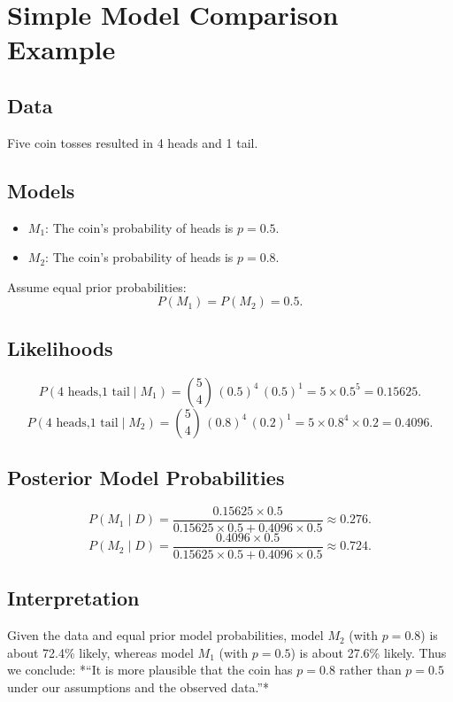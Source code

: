 \documentclass[10pt,a4paper]{article}
\begin{document}
	
	\section*{Simple Model Comparison Example}
	
	\subsection*{Data}
	Five coin tosses resulted in 4 heads and 1 tail.
	
	\subsection*{Models}
	\begin{itemize}
		\item \(M_1\): The coin’s probability of heads is \(p = 0.5\).
		\item \(M_2\): The coin’s probability of heads is \(p = 0.8\).
	\end{itemize}
	
	Assume equal prior probabilities:
	\[
	P(M_1) = P(M_2) = 0.5.
	\]
	
	\subsection*{Likelihoods}
	\[
	P(\text{4 heads,1 tail} \mid M_1)
	= \binom{5}{4}\,(0.5)^4\,(0.5)^1
	= 5 \times 0.5^5 = 0.15625.
	\]
	\[
	P(\text{4 heads,1 tail} \mid M_2)
	= \binom{5}{4}\,(0.8)^4\,(0.2)^1
	= 5 \times 0.8^4 \times 0.2 = 0.4096.
	\]
	
	\subsection*{Posterior Model Probabilities}
	\[
	P(M_1 \mid D)
	= \frac{0.15625 \times 0.5}
	{0.15625 \times 0.5 + 0.4096 \times 0.5}
	\approx 0.276.
	\]
	\[
	P(M_2 \mid D)
	= \frac{0.4096 \times 0.5}
	{0.15625 \times 0.5 + 0.4096 \times 0.5}
	\approx 0.724.
	\]
	
	\subsection*{Interpretation}
	Given the data and equal prior model probabilities, model \(M_2\) (with \(p = 0.8\)) is about 72.4\% likely, whereas model \(M_1\) (with \(p = 0.5\)) is about 27.6\% likely.  
	Thus we conclude: *“It is more plausible that the coin has \(p=0.8\) rather than \(p=0.5\) under our assumptions and the observed data.”*
	
\end{document}
